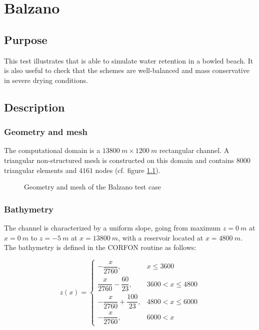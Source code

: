 
\chapter{Balzano}
%

\section{Purpose}
%
This test illustrates that  is able to simulate water retention in a bowled beach.
It is also useful to check that the schemes are well-balanced and
mass conservative in severe drying conditions.


%
\section{Description}

\subsection{Geometry and mesh}
\label{subsection:balzano:bathy}

The computational domain is a $13800~m \times 1200~m$ rectangular channel.
A triangular non-structured mesh is constructed on this domain and contains $8000$ triangular elements
and $4161$ nodes (cf. figure \ref{fig:balzano:mesh}).

\begin{figure}[H]
  \centering
  \caption{Geometry and mesh of the Balzano test case}\label{fig:balzano:mesh}
\end{figure}

\subsection{Bathymetry}

The channel is characterized by a uniform slope,
going from maximum $z=0~m$ at $x=0~m$ to $z=-5~m$ at $x=13800~m$, with a reservoir located at $x=4800~m$.
The bathymetry is defined in the CORFON routine as follows:

\begin{equation}
   z(x) =
    \begin{cases}
      -\dfrac{x}{2760} ,& x \leq 3600\\
       \dfrac{x}{2760} - \dfrac{60}{23} ,&  3600 < x \leq 4800\\
       -\dfrac{x}{2760} + \dfrac{100}{23} ,& 4800 < x \leq 6000 \\
       -\dfrac{x}{2760} ,& 6000 < x
    \end{cases}
    \label{eq:balzano:analytical}
\end{equation}

